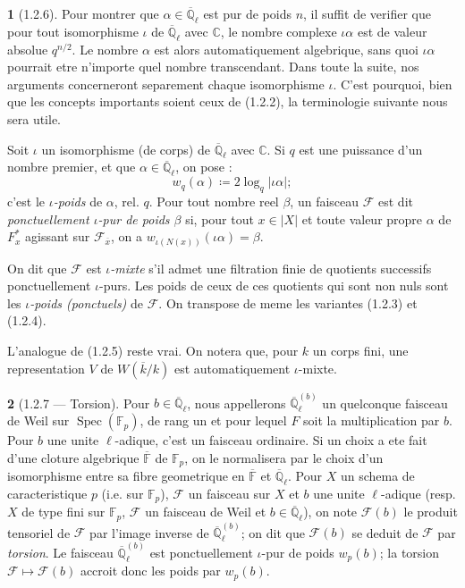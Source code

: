 \documentclass[12pt,a4paper]{article}
\theoremstyle{plain}
\theoremstyle{definition}
\theoremstyle{definition}
\newtheorem{para}{}[section]
\theoremstyle{remark}
\DeclareMathOperator{\Spec}{Spec}
\begin{document}
\begin{para}[1.2.6]
Pour montrer que $\alpha \in \overline{\mathbb{Q}}_\ell$ est pur de poids $n$, il suffit de verifier que pour tout isomorphisme $\iota$ de $\overline{\mathbb{Q}}_\ell$ avec $\mathbb{C}$, le nombre complexe $\iota\alpha$ est de valeur absolue $q^{n/2}$. Le nombre $\alpha$ est alors automatiquement algebrique, sans quoi $\iota\alpha$ pourrait etre n'importe quel nombre transcendant. Dans toute la suite, nos arguments concerneront separement chaque isomorphisme $\iota$. C'est pourquoi, bien que les concepts importants soient ceux de (1.2.2), la terminologie suivante nous sera utile.

Soit $\iota$ un isomorphisme (de corps) de $\overline{\mathbb{Q}}_\ell$ avec $\mathbb{C}$. Si $q$ est une puissance d'un nombre premier, et que $\alpha \in \overline{\mathbb{Q}}_\ell$, on pose :
\begin{equation}\tag{1.2.6.1}
w_q(\alpha) \coloneqq 2 \log_q |\iota\alpha|;
\end{equation}
c'est le \emph{$\iota$-poids} de $\alpha$, rel. $q$. Pour tout nombre reel $\beta$, un faisceau $\mathscr{F}$ est dit \emph{ponctuellement $\iota$-pur de poids $\beta$} si, pour tout $x \in |X|$ et toute valeur propre $\alpha$ de $F_x^*$ agissant sur $\mathscr{F}_{\overline{x}}$, on a $w_{\iota(N(x))}(\iota\alpha) = \beta$.

On dit que $\mathscr{F}$ est \emph{$\iota$-mixte} s'il admet une filtration finie de quotients successifs ponctuellement $\iota$-purs. Les poids de ceux de ces quotients qui sont non nuls sont les \emph{$\iota$-poids (ponctuels)} de $\mathscr{F}$. On transpose de meme les variantes (1.2.3) et (1.2.4).

L'analogue de (1.2.5) reste vrai. On notera que, pour $k$ un corps fini, une representation $V$ de $W(\overline{k}/k)$ est automatiquement $\iota$-mixte.
\end{para}

\begin{para}[1.2.7 --- Torsion]
Pour $b \in \overline{\mathbb{Q}}_\ell$, nous appellerons $\overline{\mathbb{Q}}_\ell^{(b)}$ un quelconque faisceau de Weil sur $\Spec(\mathbb{F}_p)$, de rang un et pour lequel $F$ soit la multiplication par $b$. Pour $b$ une unite $\ell$-adique, c'est un faisceau ordinaire. Si un choix a ete fait d'une cloture algebrique $\overline{\mathbb{F}}$ de $\mathbb{F}_p$, on le normalisera par le choix d'un isomorphisme entre sa fibre geometrique en $\overline{\mathbb{F}}$ et $\overline{\mathbb{Q}}_\ell$. Pour $X$ un schema de caracteristique $p$ (i.e. sur $\mathbb{F}_p$), $\mathscr{F}$ un faisceau sur $X$ et $b$ une unite $\ell$-adique (resp. $X$ de type fini sur $\mathbb{F}_p$, $\mathscr{F}$ un faisceau de Weil et $b \in \overline{\mathbb{Q}}_\ell$), on note $\mathscr{F}(b)$ le produit tensoriel de $\mathscr{F}$ par l'image inverse de $\overline{\mathbb{Q}}_\ell^{(b)}$; on dit que $\mathscr{F}(b)$ se deduit de $\mathscr{F}$ par \emph{torsion}. Le faisceau $\overline{\mathbb{Q}}_\ell^{(b)}$ est ponctuellement $\iota$-pur de poids $w_p(b)$; la torsion $\mathscr{F} \mapsto \mathscr{F}(b)$ accroit donc les poids par $w_p(b)$.
\end{para}
\end{document}
